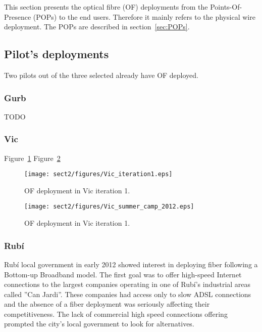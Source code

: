 This section presents the optical fibre (OF) deployments from the Points-Of-Presence (POPs) to the end users. Therefore it mainly refers to the physical wire deployment. The POPs are described in section~\ref{sec:POPs}.


\subsection{Pilot's deployments}

Two pilots out of the three selected already have OF deployed.

\subsubsection{Gurb}

TODO

\subsubsection{Vic}

Figure~\ref{fig:vic_it1}
Figure~\ref{fig:vic_sc12}


\begin{figure}[htbp]
  \centering
  \texttt{[image: sect2/figures/Vic\_iteration1.eps]} 
  \caption{OF deployment in Vic iteration 1.}
  \label{fig:vic_it1}
\end{figure}


\begin{figure}[htbp]
  \centering
  \texttt{[image: sect2/figures/Vic\_summer\_camp\_2012.eps]} 
  \caption{OF deployment in Vic iteration 1.}
  \label{fig:vic_sc12}
\end{figure}



\subsubsection{Rub\'{i}}

Rub\'{i} local government in early 2012 showed interest in deploying fiber following a Bottom-up Broadband model.
The first goal was to offer high-speed Internet connections to the largest companies operating in one of Rub\'{i}'s industrial areas called ''Can Jardi''.
These companies had access only to slow ADSL connections and the absence of a fiber deployment was seriously affecting their competitiveness.
The lack of commercial high speed connections offering prompted the city's local government to look for alternatives.

